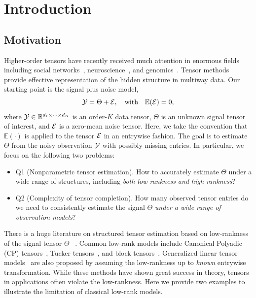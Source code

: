 \documentclass[twoside,11pt]{article}
\theoremstyle{definition}
\begin{document}
\section{Introduction}\label{sec:intro}


\subsection{Motivation}\label{sec:motivation} 
Higher-order tensors have recently received much attention in enormous fields including social networks~\citep{anandkumar2014tensor}, neuroscience~\citep{zhang2019tensor}, and genomics~\citep{hore2016tensor}. Tensor methods provide effective representation of the hidden structure in multiway data. Our starting point is the signal plus noise model,
\begin{equation}\label{eq:modelintro}
\mathcal{Y}=\Theta+\mathcal{E}, \quad \text{with}\quad \mathbb{E}(\mathcal{E})=0,
\end{equation}
where $\mathcal{Y}\in\mathbb{R}^{d_1\times \cdots \times d_K}$ is an order-$K$ data tensor, $\Theta$ is an unknown signal tensor of interest, and $\mathcal{E}$ is a zero-mean noise tensor. Here, we take the convention that $\mathbb{E}(\cdot)$ is applied to the tensor $\mathcal{E}$ in an entrywise fashion. The goal is to estimate $\Theta$ from the noisy observation $\mathcal{Y}$ with possibly missing entries. In particular, we focus on the following two problems:

\begin{itemize}[leftmargin=*,labelindent=-10pt]
\item[] Q1 (Nonparametric tensor estimation). How to accurately estimate $\Theta$ under a wide range of structures, including \emph{both low-rankness and high-rankness}?
\item[] Q2 (Complexity of tensor completion). How many observed tensor entries do we need to consistently estimate the signal $\Theta$ \emph{under a wide range of observation models}?
\end{itemize}

There is a huge literature on structured tensor estimation based on low-rankness of the signal tensor $\Theta$~\citep{jain2014provable,montanari2018spectral,anandkumar2014tensor,allen2012sparse} . Common low-rank models include Canonical Polyadic (CP) tensors~\citep{hitchcock1927expression}, Tucker tensors~\citep{de2000multilinear}, and block tensors~\citep{wang2019multiway}. Generalized linear tensor models~\citep{wang2018learning,hu2021generalized} are also proposed by assuming the low-rankness up to \emph{known} entrywise transformation.  
While these methods have shown great success in theory, tensors in applications often violate the low-rankness. Here we provide two examples to illustrate the limitation of classical low-rank models.
\end{document}
